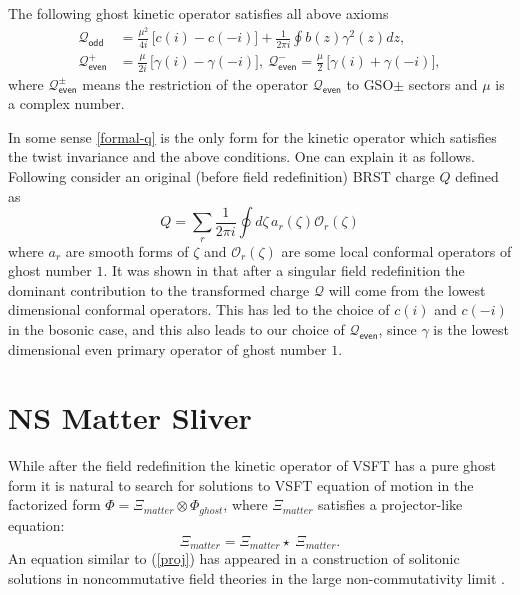 \documentclass[a4paper,12pt]{article}
\newcommand{\Qc}{\mathcal{Q}}
\newcommand{\Oc}{\mathcal{O}}
\begin{document}
The following ghost kinetic operator satisfies all above axioms
\cite{ia_vssft,Ohmori}
\begin{subequations}
\begin{align}
\Qc_{\textsf{odd}}&=\frac{\mu^2}{4i}\,\bigl[c(i)-c(-i)\bigr]
+\frac{1}{2\pi i}\oint b(z)\gamma^2(z)dz,
\\
\Qc^{+}_{\textsf{even}}&=\frac{\mu}{2i}\,\bigl[\gamma(i)-\gamma(-i)\bigr],~
\Qc^{-}_{\textsf{even}}=\frac{\mu}{2}\,\bigl[\gamma(i)+\gamma(-i)\bigr],
\end{align}
\label{formal-q}
\end{subequations}
where  $\Qc^{\pm}_{\textsf{even}}$ means the restriction of the
operator $\Qc_{\textsf{even}}$ to GSO$\pm$ sectors and $\mu$ is a complex number.

In some sense
\eqref{formal-q} is the only form for the kinetic operator which
satisfies the twist invariance and the above conditions. One can explain it as follows. Following
\cite{0111129} consider an original (before field redefinition) BRST
charge $Q$ defined as
\begin{equation}
Q=\sum_{r}\frac{1}{2\pi i}\oint d\zeta\, a_{r}(\zeta)\Oc_{r}(\zeta)
\label{ser}
\end{equation}
where $a_{r}$ are smooth forms of $\zeta$ and $\Oc_{r}(\zeta)$ are some local
conformal operators of ghost number $1$. It was shown in \cite{0111129} that
after a singular field redefinition
the  dominant contribution to the transformed charge $\Qc$
will come from the lowest dimensional conformal operators.
This has led to the choice of $c(i)$ and $c(-i)$ in the bosonic case,
and this also leads to our choice of $\Qc_{\textsf{even}}$, since $\gamma$ is
the lowest dimensional even primary operator of ghost number $1$.


\section{NS Matter Sliver}

While after the field redefinition the kinetic operator of VSFT
has a pure ghost form it is natural to search for solutions to
VSFT equation of motion
in the factorized form $\Phi =\Xi_{matter}\otimes \Phi_{ghost}$,
where $\Xi_{matter}$ satisfies a
projector-like equation:
\begin{equation}
\Xi_{matter}=\Xi_{matter}\star~\Xi_{matter}. \label{proj}
\end{equation}
An equation similar to (\ref{proj}) has appeared in a construction
of solitonic solutions in noncommutative field theories in the
large non-commutativity limit \cite{GMS}.
\end{document}
